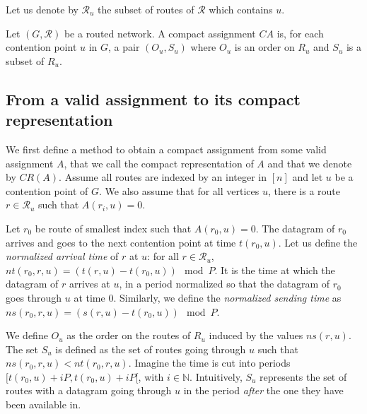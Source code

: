 \documentclass[english]{article}
\begin{document}
Let us denote by $\mathcal{R}_u$ the subset of routes of $\mathcal{R}$ which contains $u$.


\begin{definition}
Let $(G, \mathcal{R})$ be a routed network. A compact assignment $CA$ is, for each contention point $u$ in $G$, a pair $(O_u,S_u)$ where $O_u$ is an order on $R_u$ and $S_u$ is a subset of $R_u$.
\label{definition:compact}
\end{definition}


\subsection{From a valid assignment to its compact representation}

We first define a method to obtain a compact assignment from some valid assignment $A$, that we call the compact representation of $A$ and that we denote by $CR(A)$. Assume all routes are indexed by an integer in $[n]$ and let $u$ be a contention point of $G$. We also assume that for all vertices $u$, there is a route $r \in \mathcal{R}_u$ such that $A(r_i,u) = 0$.

Let $r_0$ be route of smallest index such that $A(r_0,u) = 0$. The datagram of $r_0$ arrives and goes to the next contention point at time $t(r_0,u)$. Let us define the \emph{normalized arrival time} of $r$ at $u$: for all $r \in \mathcal{R}_u$, $nt(r_0,r,u) = (t(r,u) - t(r_0,u)) \mod P$. It is the time at which the datagram of $r$ arrives at $u$, in a period normalized so that the datagram of $r_0$ goes through $u$ at time $0$. Similarly, we define the \emph{normalized sending time} as $ns(r_0,r,u) = (s(r,u) - t(r_0,u)) \mod P$.

We define $O_u$ as the order on the routes of $R_u$ induced by the values $ns(r,u)$. The set $S_u$ is defined as the set of routes going through $u$ such that $ns(r_0,r,u) < nt(r_0,r,u)$. Imagine the time is cut into periods $[t(r_0,u) + iP,t(r_0,u) + iP [$, with $i \in \mathbb{N}$. Intuitively, $S_u$ represents the set of routes with a datagram going through $u$ in the period \emph{after} the one they have been available in. 
\end{document}
